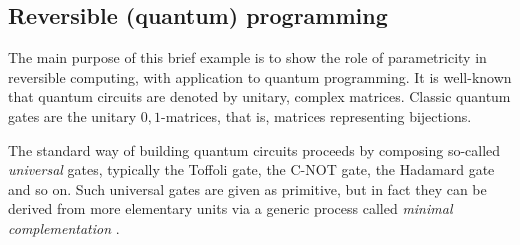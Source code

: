 \documentclass[sigplan,screen]{acmart}\settopmatter{}
\def\comp{ \mathbin{\cdot} }
\begin{document}

\subsection{Reversible (quantum) programming}
The main purpose of this brief example is to show the role of parametricity in reversible computing, with application to quantum programming. It is well-known that quantum circuits are denoted by unitary, complex matrices. Classic quantum gates are the unitary \ensuremath{\mathrm{0},\mathrm{1}}-matrices, that is, matrices representing bijections.

The standard way of building quantum circuits proceeds by composing so-called \emph{universal} gates, typically the Toffoli gate, the C-NOT gate, the Hadamard gate and so on. Such universal gates are given as primitive, but in fact they can be derived from more elementary units via a generic process called \emph{minimal complementation} \cite{Ol18}.
\end{document}
